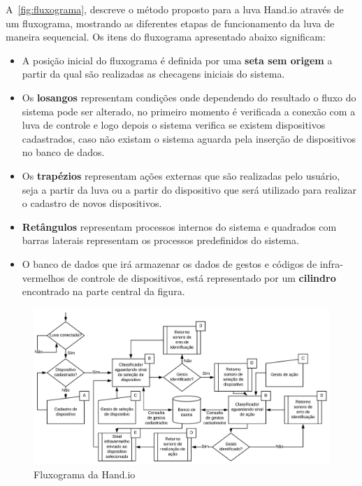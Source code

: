 A~\autoref{fig:fluxograma}, descreve o método proposto para a luva Hand.io através de um fluxograma, mostrando as diferentes etapas de funcionamento da luva de maneira sequencial. Os itens do fluxograma apresentado abaixo significam:
% 
\begin{itemize}
    \item A posição inicial do fluxograma é definida por uma \textbf{seta sem origem} a partir da qual são realizadas as checagens iniciais do sistema.
    \item Os \textbf{losangos} representam condições onde dependendo do resultado o fluxo do sistema pode ser alterado, no primeiro momento é verificada a conexão com a luva de controle e logo depois o sistema verifica se existem dispositivos cadastrados, caso não existam o sistema aguarda pela inserção de dispositivos no banco de dados.
    \item Os \textbf{trapézios} representam ações externas que são realizadas pelo usuário, seja a partir da luva ou a partir do dispositivo que será utilizado para realizar o cadastro de novos dispositivos. 
    \item \textbf{Retângulos} representam processos internos do sistema 
e quadrados com barras laterais representam os processos predefinidos do sistema.
    \item O banco de dados que irá armazenar os dados de gestos e códigos de infra-vermelhos de controle de dispositivos, está representado por um \textbf{cilindro} encontrado na parte central da figura.
\end{itemize}


\begin{figure}[ht]
    \centering
	\includegraphics[width=\textwidth, keepaspectratio]{resources/fluxograma.pdf}
	\caption{Fluxograma da Hand.io}
	\label{fig:fluxograma}
\end{figure}




